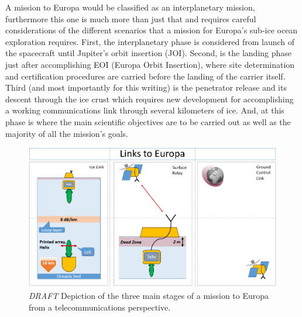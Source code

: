 

A mission to Europa would be classified as an interplanetary mission, furthermore this one is much more than just that and requires careful considerations of the different scenarios that a mission for Europa's sub-ice ocean exploration requires. First, the interplanetary phase is considered from launch of the spacecraft until Jupiter's orbit insertion (JOI). Second, is the landing phase just after accomplishing EOI (Europa Orbit Insertion), where site determination and certification procedures are carried before the landing of the carrier itself. Third (and most importantly for this writing) is the penetrator release and its descent through the ice crust which requires new development for accomplishing a working communications link through several kilometers of ice. And, at this phase is where the main scientific objectives are to be carried out as well as the majority of all the mission's goals.

\begin{figure}[htb]
	\centering
	\includegraphics[width=\textwidth]{figures/comms/europaLinks}
	\caption{ \textit{DRAFT} Depiction of the three main stages of a mission to Europa from a telecommunications perspective.}
	\label{fig:europaLinks}
\end{figure}

